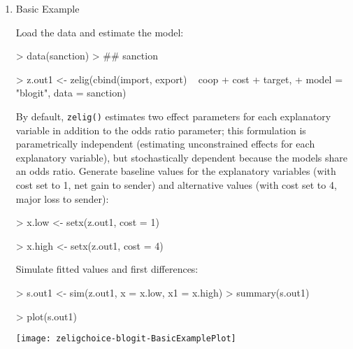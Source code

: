 \documentclass{article}
\begin{document}
\begin{enumerate}

\item {Basic Example} \label{basic.bl}

Load the data and estimate the model:  
\begin{Schunk}
\begin{Sinput}
>  data(sanction)
> ## sanction
\end{Sinput}
\end{Schunk}
\begin{Schunk}
\begin{Sinput}
>  z.out1 <- zelig(cbind(import, export) ~ coop + cost + target, 
+                   model = "blogit", data = sanction)
\end{Sinput}
\end{Schunk}
By default, {\tt zelig()} estimates two effect parameters
for each explanatory variable in addition to the odds ratio parameter;
this formulation is parametrically independent (estimating
unconstrained effects for each explanatory variable), but
stochastically dependent because the models share an odds ratio.
\newline \newline Generate baseline values for the explanatory
variables (with cost set to 1, net gain to sender) and alternative
values (with cost set to 4, major loss to sender):
\begin{Schunk}
\begin{Sinput}
>  x.low <- setx(z.out1, cost = 1)
\end{Sinput}
\end{Schunk}
\begin{Schunk}
\begin{Sinput}
> x.high <- setx(z.out1, cost = 4)
\end{Sinput}
\end{Schunk}
Simulate fitted values and first differences:  
\begin{Schunk}
\begin{Sinput}
>  s.out1 <- sim(z.out1, x = x.low, x1 = x.high)
>  summary(s.out1)
\end{Sinput}
\end{Schunk}
\begin{center}
\begin{Schunk}
\begin{Sinput}
>  plot(s.out1)
\end{Sinput}
\end{Schunk}
\texttt{[image: zeligchoice-blogit-BasicExamplePlot]}
\end{center}


\end{enumerate}
\end{document}
